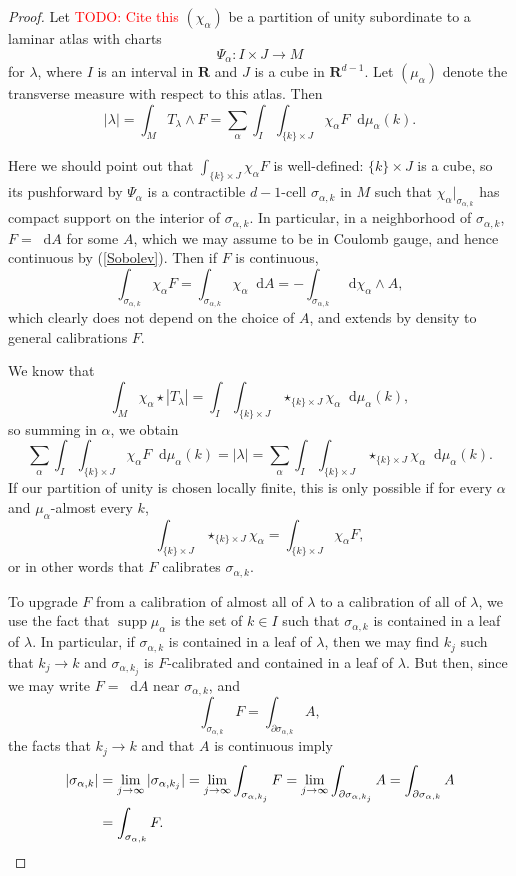 \documentclass[reqno,11pt]{amsart}
\newcommand{\RR}{\mathbf{R}}
\newcommand*\dif{\mathop{}\!\mathrm{d}}
\DeclareMathOperator{\supp}{supp}
\theoremstyle{definition}
\numberwithin{equation}{section}
\newcommand\todo[1]{\textcolor{red}{TODO: #1}}
\begin{document}
\begin{proof}
Let \todo{Cite this} $(\chi_\alpha)$ be a partition of unity subordinate to a laminar atlas with charts
$$\Psi_\alpha: I \times J \to M$$
for $\lambda$, where $I$ is an interval in $\RR$ and $J$ is a cube in $\RR^{d - 1}$.
Let $(\mu_\alpha)$ denote the transverse measure with respect to this atlas.
Then 
$$|\lambda| = \int_M T_\lambda \wedge F = \sum_\alpha \int_I \int_{\{k\} \times J} \chi_\alpha F \dif \mu_\alpha(k).$$

Here we should point out that $\int_{\{k\} \times J} \chi_\alpha F$ is well-defined: $\{k\} \times J$ is a cube, so its pushforward by $\Psi_\alpha$ is a contractible $d-1$-cell $\sigma_{\alpha, k}$ in $M$ such that $\chi_\alpha|_{\sigma_{\alpha, k}}$ has compact support on the interior of $\sigma_{\alpha, k}$.
In particular, in a neighborhood of $\sigma_{\alpha, k}$, $F = \dif A$ for some $A$, which we may assume to be in Coulomb gauge, and hence continuous by (\ref{Sobolev}).
Then if $F$ is continuous,
$$\int_{\sigma_{\alpha, k}} \chi_\alpha F = \int_{\sigma_{\alpha, k}} \chi_\alpha \dif A = -\int_{\sigma_{\alpha, k}} \dif \chi_\alpha \wedge A,$$
which clearly does not depend on the choice of $A$, and extends by density to general calibrations $F$.

We know that 
$$\int_M \chi_\alpha \star |T_\lambda| = \int_I \int_{\{k\} \times J} \star_{\{k\} \times J} \chi_\alpha \dif \mu_\alpha(k),$$
so summing in $\alpha$, we obtain 
$$\sum_\alpha \int_I \int_{\{k\} \times J} \chi_\alpha F \dif \mu_\alpha(k) = |\lambda| = \sum_\alpha \int_I \int_{\{k\} \times J} \star_{\{k\} \times J} \chi_\alpha \dif \mu_\alpha(k).$$
If our partition of unity is chosen locally finite, this is only possible if for every $\alpha$ and $\mu_\alpha$-almost every $k$, 
$$\int_{\{k\} \times J} \star_{\{k\} \times J} \chi_\alpha = \int_{\{k\} \times J} \chi_\alpha F,$$
or in other words that $F$ calibrates $\sigma_{\alpha, k}$.

To upgrade $F$ from a calibration of almost all of $\lambda$ to a calibration of all of $\lambda$, we use the fact that $\supp \mu_\alpha$ is the set of $k \in I$ such that $\sigma_{\alpha, k}$ is contained in a leaf of $\lambda$.
In particular, if $\sigma_{\alpha, k}$ is contained in a leaf of $\lambda$, then we may find $k_j$ such that $k_j \to k$ and $\sigma_{\alpha, k_j}$ is $F$-calibrated and contained in a leaf of $\lambda$.
But then, since we may write $F = \dif A$ near $\sigma_{\alpha, k}$, and 
$$\int_{\sigma_{\alpha, k}} F = \int_{\partial \sigma_{\alpha, k}} A,$$
the facts that $k_j \to k$ and that $A$ is continuous imply 
\begin{align*}
|\sigma_{\alpha, k}| &= \lim_{j \to \infty} |\sigma_{\alpha, k_j}| = \lim_{j \to \infty} \int_{\sigma_{\alpha, k_j}} F = \lim_{j \to \infty} \int_{\partial \sigma_{\alpha, k_j}} A = \int_{\partial \sigma_{\alpha, k}} A \\
&= \int_{\sigma_{\alpha, k}} F. \qedhere 
\end{align*}
\end{proof}
\end{document}
